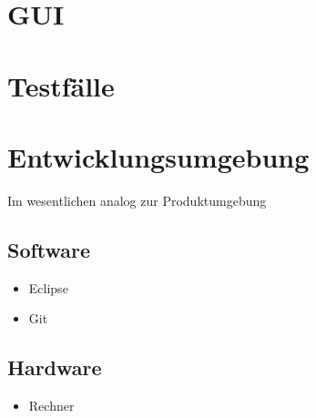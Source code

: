 \documentclass[a4paper,10pt]{article}
\begin{document}
\section{GUI}

\section{Testfälle}

\section{Entwicklungsumgebung}
Im wesentlichen analog zur Produktumgebung

\subsection{Software}
\begin{itemize}
\item Eclipse
\item Git
\end{itemize}
\subsection{Hardware}
\begin{itemize}
\item Rechner
\end{itemize}


\clearpage

\end{document}
